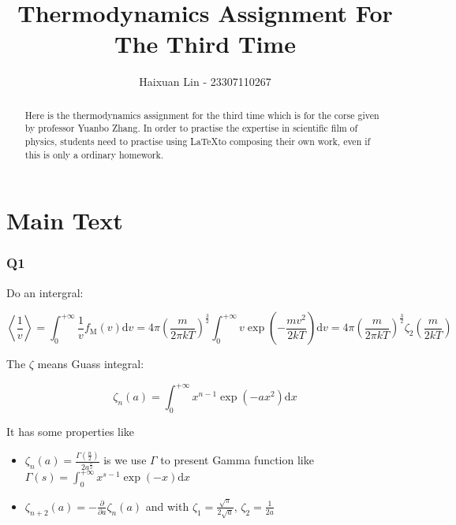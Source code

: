 \documentclass[a4paper,11pt]{amsart}
\title{Thermodynamics Assignment For The Third Time}
\author{Haixuan Lin - 23307110267}
\theoremstyle{definition}
\begin{document}
	
	\begin{abstract}
		Here is the thermodynamics assignment for the third time which is for the corse given by professor Yuanbo Zhang. In order to practise the expertise in scientific film of physics, students need to practise using \LaTeX to composing their own work, even if this is only a ordinary homework.
	\end{abstract}
	
	\maketitle
	
	\section*{Main Text}
	
    \subsubsection*{Q1}

    Do an intergral:

    $$
    \left<\frac{1}{v}\right>=\int_0^{+\infty}{\frac{1}{v}f_{\mathrm{M}}\left( v \right) \mathrm{d}v=4\pi \left( \frac{m}{2\pi kT} \right) ^{\frac{3}{2}}\int_0^{+\infty}{v}\exp \left( -\frac{mv^2}{2kT} \right) \mathrm{d}v}=4\pi \left( \frac{m}{2\pi kT} \right) ^{\frac{3}{2}}\zeta _2\left( \frac{m}{2kT} \right) 
    $$

	The $\zeta$ means Guass integral:
	
	$$
	\zeta _n\left( a \right) =\int_0^{+\infty}{x^{n-1}\exp \left( -ax^2 \right) \mathrm{d}x}
	$$
	
	It has some properties like
	
	\begin{itemize}
		
		\item $\displaystyle\zeta _n\left( a \right) =\frac{\Gamma \left( \tfrac{n}{2} \right)}{2a^{\tfrac{n}{2}}}$ is we use $\Gamma$ to present Gamma function like $\displaystyle\Gamma \left( s \right) =\int_0^{+\infty}{x^{s-1}\exp \left( -x \right) \mathrm{d}x}$
		
		\item $\displaystyle\zeta _{n+2}\left( a \right) =-\frac{\partial}{\partial a}\zeta _n\left( a \right)$ and with $\displaystyle\zeta _1=\frac{\sqrt{\pi}}{2\sqrt{a}},\,\zeta _2=\frac{1}{2a}$
		
	\end{itemize}
	
\end{document}
